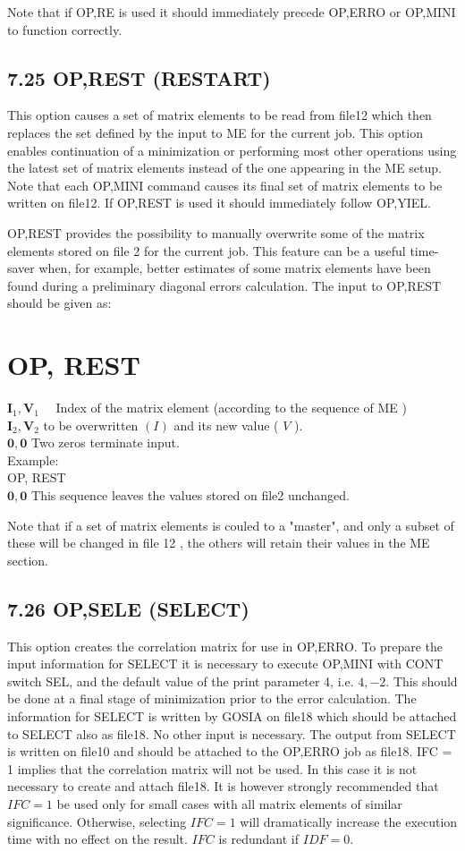 \documentclass[10pt]{article}
\begin{document}
Note that if OP,RE is used it should immediately precede OP,ERRO or OP,MINI to function correctly.

\subsection*{7.25 OP,REST (RESTART)}
This option causes a set of matrix elements to be read from file12 which then replaces the set defined by the input to ME for the current job. This option enables continuation of a minimization or performing most other operations using the latest set of matrix elements instead of the one appearing in the ME setup. Note that each OP,MINI command causes its final set of matrix elements to be written on file12. If OP,REST is used it should immediately follow OP,YIEL.

OP,REST provides the possibility to manually overwrite some of the matrix elements stored on file 2 for the current job. This feature can be a useful time-saver when, for example, better estimates of some matrix elements have been found during a preliminary diagonal errors calculation. The input to OP,REST should be given as:

\section*{OP, REST}
$\mathbf{I}_{1}, \mathbf{V}_{1} \quad$ Index of the matrix element (according to the sequence of ME )\\
$\mathbf{I}_{2}, \mathbf{V}_{2}$ to be overwritten $(I)$ and its new value ( $V$ ).\\
$\mathbf{0}, \mathbf{0}$ Two zeros terminate input.\\
Example:\\
OP, REST\\
$\mathbf{0}, \mathbf{0}$ This sequence leaves the values stored on file2 unchanged.

Note that if a set of matrix elements is couled to a "master", and only a subset of these will be changed in file 12 , the others will retain their values in the ME section.

\subsection*{7.26 OP,SELE (SELECT)}
This option creates the correlation matrix for use in OP,ERRO. To prepare the input information for SELECT it is necessary to execute OP,MINI with CONT switch SEL, and the default value of the print parameter 4, i.e. $4,-2$. This should be done at a final stage of minimization prior to the error calculation. The information for SELECT is written by GOSIA on file18 which should be attached to SELECT also as file18. No other input is necessary. The output from SELECT is written on file10 and should be attached to the OP,ERRO job as file18. IFC = 1 implies that the correlation matrix will not be used. In this case it is not necessary to create and attach file18. It is however strongly recommended that $I F C=1$ be used only for small cases with all matrix elements of similar significance. Otherwise, selecting $I F C=1$ will dramatically increase the execution time with no effect on the result. $I F C$ is redundant if $I D F=0$.
\end{document}
